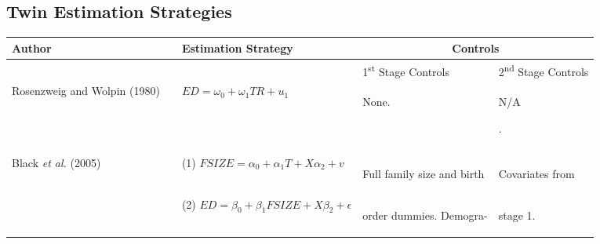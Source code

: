 \documentclass{article}[11pt,subeqn]
\begin{document}
\begin{spacing}{1.25}
\newpage


\newpage
\appendix
\section{Twin Estimation Strategies}
\label{scn:litrev}

\vspace{19.2cm}	

\begin{center}
\begin{rotate}{90}
\begin{tabular}{lp{4mm}lll}\toprule
Author& &  Estimation Strategy & \multicolumn{2}{c}{Controls} \\ \midrule
&& & \hspace{5mm}1\textsuperscript{st} Stage Controls & 2\textsuperscript{nd} Stage Controls \\  \cmidrule(r){4-4} \cmidrule{5-5}
Rosenzweig and Wolpin (1980) & &
$ED=\omega_0+\omega_1 TR+u_1$&
\begin{small}None.\end{small}&
\begin{small}N\slash A\end{small}.
\\
\begin{footnotesize}\end{footnotesize}&\begin{footnotesize}\end{footnotesize}&\begin{footnotesize}\end{footnotesize}&\begin{footnotesize}\end{footnotesize}&\begin{footnotesize}\end{footnotesize}\\
\multirow{2}{*}{Black \emph{et al.} (2005)} & &
(1) $FSIZE=\alpha_0 + \alpha_1 T + X\alpha_2 + v$ &
\begin{small}Full family size and  birth \end{small}&
\begin{small}Covariates from\end{small}
\\
& &
(2) $ED=\beta_0+\beta_1 FSIZE + X\beta_2 + \epsilon$ &
\begin{small}order dummies. Demogra-\end{small}  &
\begin{small}stage 1.\end{small}

\end{tabular}
\end{rotate}
\end{center}
\end{spacing}
\end{document}

